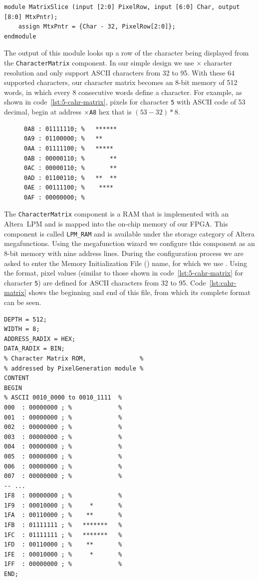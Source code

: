\documentclass[12pt, logo=tehranDLDL/ut]{tehranDLDL}
\begin{document}
\begin{lstlisting}[caption={\lstinline{MatrixSlice} Verilog code\label{lst:matrix-slice}}]
module MatrixSlice (input [2:0] PixelRow, input [6:0] Char, output [8:0] MtxPntr);
    assign MtxPntr = {Char - 32, PixelRow[2:0]}; 
endmodule
\end{lstlisting}

The output of this module looks up a row of the character being displayed from the \lstinline{CharacterMatrix} component. In our simple design we use $\times$ character resolution and only support ASCII characters from 32 to 95. With these 64 supported characters, our character matrix becomes an 8-bit memory of 512 words, in which every 8 consecutive words define a character.
For example, as shown in code~\ref{lst:5-cahr-matrix}, pixels for character \texttt{5} with ASCII code of 53 decimal, begin at address \texttt{$\times$A8} hex that is $(53-32)*8$.

\begin{figure}
\begin{lstlisting}[caption={Character matrix for character \texttt{5}\label{lst:5-cahr-matrix}},language={mif},linewidth=0.5\textwidth]
0A8 : 01111110; %   ******
0A9 : 01100000; %   **
0AA : 01111100; %   *****
0AB : 00000110; %       **
0AC : 00000110; %       **
0AD : 01100110; %   **  **
0AE : 00111100; %    ****
0AF : 00000000; %
\end{lstlisting}
\end{figure}

The \lstinline{CharacterMatrix} component is a RAM that is implemented with an Altera~LPM and is mapped into the on-chip memory of our FPGA. This component is called \lstinline{LPM_RAM} and is available under the storage category of Altera megafunctions. Using the megafunction wizard we configure this component as an 8-bit memory with nine address lines. During the configuration process we are asked to enter the Memory Initialization File () name, for which we use . Using the  format, pixel values (similar to those shown in code~\ref{lst:5-cahr-matrix} for character \texttt{5}) are defined for ASCII characters from 32 to 95. Code~\ref{lst:cahr-matrix} shows the beginning and end of this file, from which its complete format can be seen.

\begin{lstlisting}[caption={Character matrix \texttt{mif} file\label{lst:cahr-matrix}},language={mif}]
DEPTH = 512;
WIDTH = 8;
ADDRESS_RADIX = HEX;
DATA_RADIX = BIN;
% Character Matrix ROM,               %
% addressed by PixelGeneration module %
CONTENT
BEGIN
% ASCII 0010_0000 to 0010_1111  %
000  : 00000000 ; %             %
001  : 00000000 ; %             %
002  : 00000000 ; %             %
003  : 00000000 ; %             %
004  : 00000000 ; %             %
005  : 00000000 ; %             %
006  : 00000000 ; %             %
007  : 00000000 ; %             %
-- ...
1F8  : 00000000 ; %             %
1F9  : 00010000 ; %     *       %
1FA  : 00110000 ; %    **       %
1FB  : 01111111 ; %   *******   %
1FC  : 01111111 ; %   *******   %
1FD  : 00110000 ; %    **       %
1FE  : 00010000 ; %     *       %
1FF  : 00000000 ; %             %
END;
\end{lstlisting}
\end{document}
